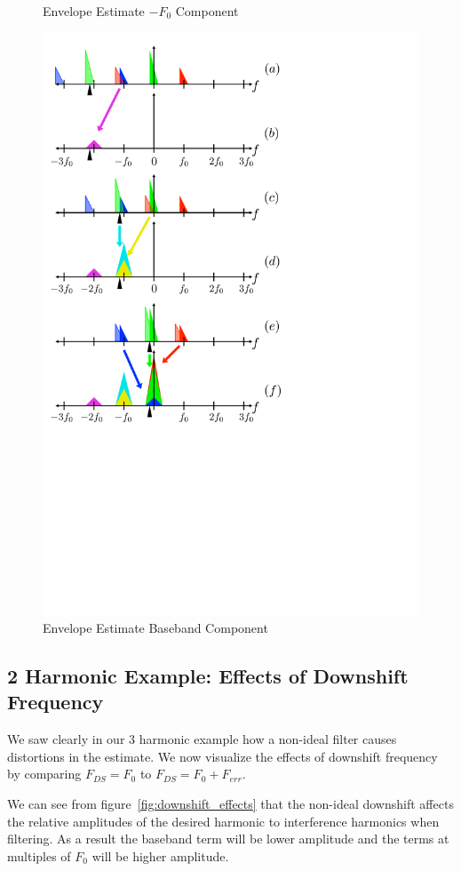 \documentclass [11pt, proquest,oneside] {ganter_thesis}[2015/03/03]
\begin{document}
\begin{figure}[!ht]
    \caption{Envelope Estimate $-F_0$ Component}\label{fig:harmonic_envelope_F0}
    \includegraphics[width=.62\textwidth]{harmonic_envelope_0}
    \caption{Envelope Estimate Baseband Component}\label{fig:harmonic_envelope_0}
\end{figure}

\clearpage

\subsection{2 Harmonic Example: Effects of Downshift Frequency}

We saw clearly in our 3 harmonic example how a non-ideal filter causes distortions in the estimate.  We now visualize the effects of downshift frequency by comparing $F_{DS} = F_0$ to $F_{DS} = F_0 + F_{err}$.

We can see from figure~\ref{fig:downshift_effects} that the non-ideal downshift affects the relative amplitudes of the desired harmonic to interference harmonics when filtering.  As a result the baseband term will be lower amplitude and the terms at multiples of $F_0$ will be higher amplitude.
\end{document}
